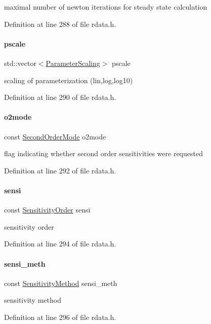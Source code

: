 maximal number of newton iterations for steady state calculation 

Definition at line 288 of file rdata.\+h.

\mbox{\label{classamici_1_1_return_data_a5d1c7237dc998202fe1b3393b50f77ce}} 
\paragraph{\texorpdfstring{pscale}{pscale}}
{\footnotesize\ttfamily std\+::vector$<$\mbox{\hyperlink{namespaceamici_a42f062082226e9284c201d9eab71a3a0}{Parameter\+Scaling}}$>$ pscale}

scaling of parameterization (lin,log,log10) 

Definition at line 290 of file rdata.\+h.

\mbox{\label{classamici_1_1_return_data_acc235cad50283f7891e2d834f1cbeb90}} 
\paragraph{\texorpdfstring{o2mode}{o2mode}}
{\footnotesize\ttfamily const \mbox{\hyperlink{namespaceamici_a2d77779286167d5603a870bf9f6c21ba}{Second\+Order\+Mode}} o2mode}

flag indicating whether second order sensitivities were requested 

Definition at line 292 of file rdata.\+h.

\mbox{\label{classamici_1_1_return_data_ae273fd99697cf0308e7471d822c22d7f}} 
\paragraph{\texorpdfstring{sensi}{sensi}}
{\footnotesize\ttfamily const \mbox{\hyperlink{namespaceamici_aaa03ec2f8c4d5323b98d71134a462fda}{Sensitivity\+Order}} sensi}

sensitivity order 

Definition at line 294 of file rdata.\+h.

\mbox{\label{classamici_1_1_return_data_ab761d3023398d7f741a0cfc342dc29f5}} 
\paragraph{\texorpdfstring{sensi\_meth}{sensi\_meth}}
{\footnotesize\ttfamily const \mbox{\hyperlink{namespaceamici_aa0fa493529f6872e7e776b91fbbf38f9}{Sensitivity\+Method}} sensi\+\_\+meth}

sensitivity method 

Definition at line 296 of file rdata.\+h.

